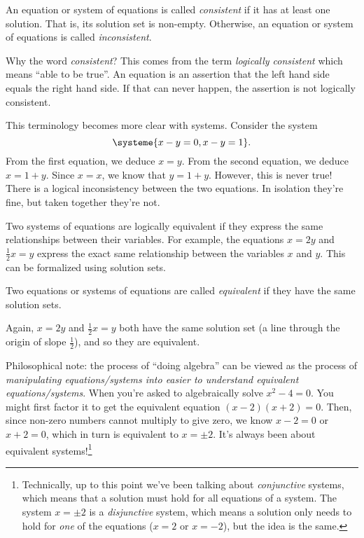 	\begin{definition}
		An equation or system of equations is called \emph{consistent} if it has at least one solution. That
		is, its solution set is non-empty. Otherwise, an equation or system of equations is called \emph{inconsistent}.
	\end{definition}

	Why the word \emph{consistent}? This comes from the term \emph{logically consistent} which means ``able to be true''.
	An equation is an assertion that the left hand side equals the right hand side. If that can never happen, the assertion
	is not logically consistent.

	This terminology becomes more clear with systems. Consider the system
	\[
		\systeme{x-y=0,x-y=1}.
	\]
	From the first equation, we deduce $x=y$. From the second equation, we deduce $x=1+y$. Since $x=x$, we know that
	$y=1+y$. However, this is never true! There is a logical inconsistency between the two equations. In isolation they're
	fine, but taken together they're not.

	Two systems of equations are logically equivalent if they express the same relationships
	between their variables. For example, the equations $x=2y$ and $\tfrac{1}{2}x=y$ express the exact same
	relationship between the variables $x$ and $y$. This can be formalized using solution sets.

	\begin{definition}
		Two equations or systems of equations are called \emph{equivalent} if they have the same solution sets.
	\end{definition}

	Again, $x=2y$ and $\tfrac{1}{2}x=y$ both have the same solution set (a line through the origin of slope $\tfrac{1}{2}$),
	and so they are equivalent.

	Philosophical note: the process of ``doing algebra'' can be viewed as
	the process of \emph{manipulating equations/systems into easier to understand equivalent 
	equations/systems}. When you're asked to algebraically solve $x^2-4=0$. You might first factor it to get the 
	equivalent equation $(x-2)(x+2)=0$. Then, since non-zero numbers cannot multiply to give zero, we know
	$x-2=0$ or $x+2=0$, which in turn is equivalent to $x=\pm2$. It's always been about equivalent systems!\footnote{
	Technically, up to this point we've been talking about \emph{conjunctive} systems, which means that a solution
	must hold for all equations of a system. The system $x=\pm 2$ is a \emph{disjunctive} system, which means a solution
	only needs to hold for \emph{one} of the equations ($x=2$ or $x=-2$), but the idea is the same.}

